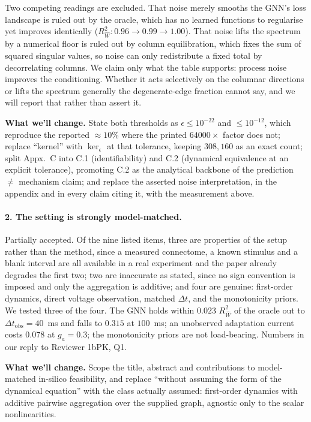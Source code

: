 \documentclass[11pt]{article}
\newcommand{\Rw}{R^2_{\widehat W}}
\begin{document}
Two competing readings are excluded. That noise merely smooths the GNN's loss
landscape is ruled out by the oracle, which has no learned functions to
regularise yet improves identically ($\Rw: 0.96 \to 0.99 \to 1.00$). That noise
lifts the spectrum by a numerical floor is ruled out by column equilibration,
which fixes the sum of squared singular values, so noise can only redistribute a
fixed total by decorrelating columns. We claim only what the table supports:
process noise improves the conditioning. Whether it acts selectively on the
columnar directions or lifts the spectrum generally the degenerate-edge fraction
cannot say, and we will report that rather than assert it.

\textbf{What we'll change.} State both thresholds as $\epsilon \leq 10^{-22}$ and
$\leq 10^{-12}$, which reproduce the reported $\approx\!10\%$ where the printed
$64000\times$ factor does not; replace ``kernel'' with $\ker_\epsilon$ at that
tolerance, keeping $308{,}160$ as an exact count; split Appx.~C into C.1
(identifiability) and C.2 (dynamical equivalence at an explicit tolerance),
promoting C.2 as the analytical backbone of the prediction $\neq$ mechanism
claim; and replace the asserted noise interpretation, in the appendix and in
every claim citing it, with the measurement above.

\paragraph{2. The setting is strongly model-matched.}
Partially accepted. Of the nine listed items, three are properties of the setup
rather than the method, since a measured connectome, a known stimulus and a
blank interval are all available in a real experiment and the paper already
degrades the first two; two are inaccurate as stated, since no sign convention
is imposed and only the aggregation is additive; and four are genuine:
first-order dynamics, direct voltage observation, matched $\Delta t$, and the
monotonicity priors. We tested three of the four. The GNN holds within $0.023$
$\Rw$ of the oracle out to $\Delta t_{\mathrm{obs}} = 40$~ms and falls to
$0.315$ at $100$~ms; an unobserved adaptation current costs $0.078$ at
$g_a = 0.3$; the monotonicity priors are not load-bearing. Numbers in our reply
to Reviewer 1bPK, Q1.

\textbf{What we'll change.} Scope the title, abstract and contributions to
model-matched in-silico feasibility, and replace ``without assuming the form of
the dynamical equation'' with the class actually assumed: first-order dynamics
with additive pairwise aggregation over the supplied graph, agnostic only to the
scalar nonlinearities.
\end{document}
